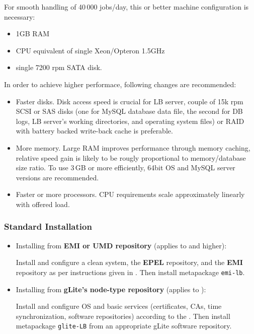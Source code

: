 For smooth handling of 40\,000 jobs/day, this or better machine configuration 
is necessary:
\begin{itemize}
\item 1GB RAM
\item CPU equivalent of single Xeon/Opteron 1.5GHz
\item single 7200 rpm SATA disk.
\end{itemize}
In order to achieve higher performace, following changes are recommended:
\begin{itemize}
\item Faster disks. Disk access speed is crucial for LB server, couple of 15k rpm
SCSI or SAS disks (one for MySQL database data file, the second for DB logs, LB server's
working directories, and operating system files) or RAID with battery backed 
write-back cache is preferable.
\item More memory. Large RAM improves performance through memory caching,
relative speed gain is likely to be rougly proportional to memory/database size ratio.
To use 3\,GB or more efficiently, 64bit OS and MySQL server versions are recommended.
\item Faster or more processors. CPU requirements scale approximately linearly with
offered load.
\end{itemize}

\subsubsection{Standard Installation}

\begin{itemize}
\item Installing from \textbf{EMI or UMD repository} (applies to  and higher):

Install and configure a clean system, the \textbf{EPEL} repository, and the \textbf{EMI} repository as per instructions given in . Then install metapackage \texttt{emi-lb}.

\item Installing from \textbf{gLite's node-type repository} (applies to ):

Install and configure OS and basic services (certificates, CAs, time synchronization, software repositories) according to the . Then install metapackage \texttt{glite-LB} from an appropriate gLite software repository.

\end{itemize}

